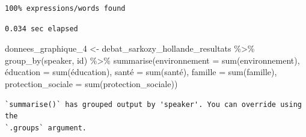 \documentclass[
  letterpaper,
  DIV=11,
  numbers=noendperiod]{scrartcl}
\newenvironment{Shaded}{\begin{snugshade}}{\end{snugshade}}
\newcommand{\AttributeTok}[1]{\textcolor[rgb]{0.40,0.45,0.13}{#1}}
\newcommand{\FunctionTok}[1]{\textcolor[rgb]{0.28,0.35,0.67}{#1}}
\newcommand{\NormalTok}[1]{\textcolor[rgb]{0.00,0.23,0.31}{#1}}
\newcommand{\OtherTok}[1]{\textcolor[rgb]{0.00,0.23,0.31}{#1}}
\newcommand{\SpecialCharTok}[1]{\textcolor[rgb]{0.37,0.37,0.37}{#1}}
\begin{document}
\begin{verbatim}
100% expressions/words found
\end{verbatim}

\begin{verbatim}
0.034 sec elapsed
\end{verbatim}

\begin{Shaded}
\begin{Highlighting}[]
\NormalTok{donnees\_graphique\_4 }\OtherTok{\textless{}{-}}\NormalTok{ debat\_sarkozy\_hollande\_resultats }\SpecialCharTok{\%\textgreater{}\%} \FunctionTok{group\_by}\NormalTok{(speaker, id) }\SpecialCharTok{\%\textgreater{}\%} \FunctionTok{summarise}\NormalTok{(}\AttributeTok{environnement =} \FunctionTok{sum}\NormalTok{(environnement), é}\AttributeTok{ducation =} \FunctionTok{sum}\NormalTok{(éducation), santé }\OtherTok{=} \FunctionTok{sum}\NormalTok{(santé), }\AttributeTok{famille =} \FunctionTok{sum}\NormalTok{(famille), }\AttributeTok{protection\_sociale =} \FunctionTok{sum}\NormalTok{(protection\_sociale))}
\end{Highlighting}
\end{Shaded}

\begin{verbatim}
`summarise()` has grouped output by 'speaker'. You can override using the
`.groups` argument.
\end{verbatim}
\end{document}
